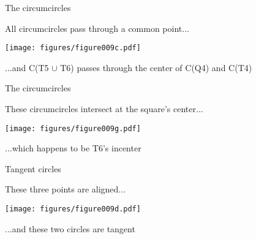 \documentclass[14pt]{beamer}
\begin{document}

    \begin{frame}{The circumcircles}
        \begin{center}
            All circumcircles pass through a common point...
        \end{center}
        \hspace{3.92em} \texttt{[image: figures/figure009c.pdf]} \\
        \begin{center}
            \footnotesize ...and C(T5 $\cup$ T6) passes through the center of C(Q4) and C(T4)
        \end{center}
    \end{frame}


    \begin{frame}{The circumcircles}
        \begin{center}
            These circumcircles intersect at the square's center...
        \end{center}
        \vspace{0.90em}
        \hspace{5.25em} \texttt{[image: figures/figure009g.pdf]} \\
        \begin{center}
            ...which happens to be T6's incenter
        \end{center}
    \end{frame}


    \begin{frame}{Tangent circles}
        \begin{center}
            These three points are aligned...
        \end{center}
        \hspace{3.92em} \texttt{[image: figures/figure009d.pdf]} \\
        \begin{center}
             ...and these two circles are tangent
        \end{center}
    \end{frame}

\end{document}
